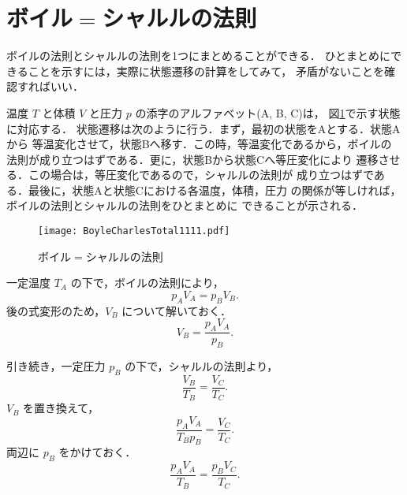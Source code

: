        \section{ボイル$=$シャルルの法則}
            ボイルの法則とシャルルの法則を1つにまとめることができる．
            ひとまとめにできることを示すには，実際に状態遷移の計算をしてみて，
            矛盾がないことを確認すればいい．

            温度 $T$ と体積 $V$ と圧力 $p$ の添字のアルファベット(A, B, C)は，
            図\ref{fig:BoyleCharlesTotal1111}で示す状態に対応する．
            状態遷移は次のように行う．まず，最初の状態をAとする．状態Aから
            等温変化させて，状態Bへ移す．この時，等温変化であるから，ボイルの
            法則が成り立つはずである．更に，状態Bから状態Cへ等圧変化により
            遷移させる．この場合は，等圧変化であるので，シャルルの法則が
            成り立つはずである．最後に，状態Aと状態Cにおける各温度，体積，圧力
            の関係が等しければ，ボイルの法則とシャルルの法則をひとまとめに
            できることが示される．
            \begin{figure}[hbt]
                \begin{center}
                    \texttt{[image: BoyleCharlesTotal1111.pdf]}
                    \caption{ボイル$=$シャルルの法則}
                    \label{fig:BoyleCharlesTotal1111}
                \end{center}
            \end{figure}

            一定温度 $T_{A}$ の下で，ボイルの法則により，
                \begin{equation*}
                    {p}_{A}{V}_{A} = {p}_{B}{V}_{B}.
                \end{equation*}
            後の式変形のため，${V}_{B}$ について解いておく．
                \begin{equation*}
                    {V}_{B} = \frac{{p}_{A}{V}_{A}}{{p}_{B}}.
                \end{equation*}

            引き続き，一定圧力 $p_{B}$ の下で，シャルルの法則より，
                \begin{equation*}
                    \frac{{V}_{B}}{{T}_{B}} = \frac{{V}_{C}}{{T}_{C}}.
                \end{equation*}
            ${V}_{B}$ を置き換えて，
                \begin{equation*}
                    \frac{{p}_{A}{V}_{A}}{{T}_{B}{p}_{B}} = \frac{{V}_{C}}{{T}_{C}}.
                \end{equation*}
            両辺に ${p}_{B}$ をかけておく．
                \begin{equation*}
                    \frac{{p}_{A}{V}_{A}}{{T}_{B}} = \frac{{p}_{B}{V}_{C}}{{T}_{C}}.
                \end{equation*}

